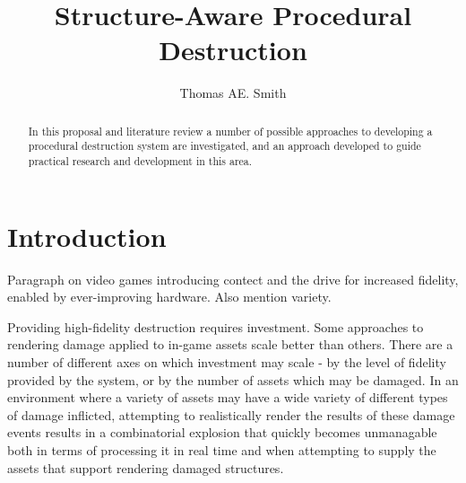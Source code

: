 \documentclass[11pt]{report}
\title{Structure-Aware Procedural Destruction} \author{Thomas AE. Smith}
\begin{document}
\maketitle

\begin{abstract} %
	In this proposal and literature review a number of possible approaches to developing a procedural destruction system are investigated, and an approach developed to guide practical research and development in this area.
\end{abstract}


\chapter{Introduction}
	Paragraph on video games introducing contect and the drive for increased fidelity, enabled by ever-improving hardware. Also mention variety.

	Providing high-fidelity destruction requires investment. Some approaches to rendering damage applied to in-game assets scale better than others. There are a number of different axes on which investment may scale - by the level of fidelity provided by the system, or by the number of assets which may be damaged. In an environment where a variety of assets may have a wide variety of different types of damage inflicted, attempting to realistically render the results of these damage events results in a combinatorial explosion that quickly becomes unmanagable both in terms of processing it in real time and when attempting to supply the assets that support rendering damaged structures.
\end{document}
